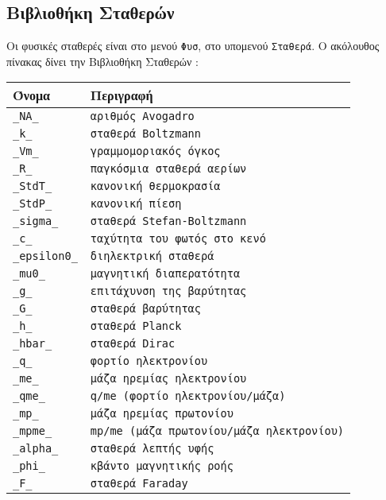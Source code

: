 \documentclass[a4paper,11pt]{book}
\newcommand{\en}{\selectlanguage{english}}
\begin{document}
\subsection{Βιβλιοθήκη Σταθερών}
Οι φυσικές σταθερές είναι στο μενού {\tt Φυσ}, στο υπομενού {\tt Σταθερά}.
Ο ακόλουθος πίνακας δίνει την Βιβλιοθήκη Σταθερών  :

\begin{center}
\begin{tabular}{|l|l|}
\hline
Όνομα & Περιγραφή\\
\hline
{\en\tt \_NA\_} & {\tt  αριθμός \en Avogadro}\\
{\en\tt \_k\_} & {\tt  σταθερά \en Boltzmann}\\
{\en\tt \_Vm\_} & {\tt γραμμομοριακός όγκος}\\
{\en\tt \_R\_} & {\tt παγκόσμια σταθερά αερίων}\\
{\en\tt \_StdT\_} & {\tt κανονική θερμοκρασία} \\
{\en\tt \_StdP\_} & {\tt κανονική πίεση}\\
{\en\tt \_sigma\_} & {\tt σταθερά \en Stefan-Boltzmann}\\
{\en\tt \_c\_} & {\tt ταχύτητα του φωτός στο κενό}\\
{\en\tt \_epsilon0\_} & {\tt διηλεκτρική σταθερά}\\
{\en\tt \_mu0\_} &{\tt  μαγνητική διαπερατότητα}\\
{\en\tt \_g\_} &{\tt επιτάχυνση της βαρύτητας}\\
{\en\tt \_G\_} &{\tt σταθερά βαρύτητας}\\
{\en\tt \_h\_} &{\tt σταθερά \en Planck}\\
{\en\tt \_hbar\_} &{\tt σταθερά \en Dirac}\\
{\en\tt \_q\_} &{\tt φορτίο ηλεκτρονίου}\\
{\en\tt \_me\_} &{\tt μάζα ηρεμίας ηλεκτρονίου}\\
{\en\tt \_qme\_} &{\tt {\en q/me} (φορτίο ηλεκτρονίου/μάζα)} \\
{\en\tt \_mp\_} &{\tt μάζα ηρεμίας πρωτονίου}\\
{\en\tt \_mpme\_} &{\tt {\en mp/me} (μάζα πρωτονίου/μάζα ηλεκτρονίου)} \\
{\en\tt \_alpha\_} &{\tt σταθερά λεπτής υφής}\\
{\en\tt \_phi\_} & {\tt κβάντο μαγνητικής ροής}\\
{\en\tt \_F\_} & {\tt  σταθερά \en Faraday}\\

\end{tabular}
\end{center}
\end{document}
